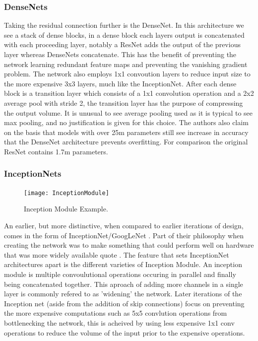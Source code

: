   \subsubsection{DenseNets}
    Taking the residual connection further is the DenseNet. In this architecture we see a stack of dense blocks, in a dense block each layers output is concatenated with each proceeding layer, notably a ResNet adds the output of the previous layer whereas DenseNets concatenate. This has the benefit of preventing the network learning redundant feature maps and preventing the vanishing gradient problem. The network also employs 1x1 convoution layers to reduce input size to the more expensive 3x3 layers, much like the InceptionNet. After each dense block is a transition layer which consists of a 1x1 convolution operation and a 2x2 average pool with stride 2, the transition layer has the purpose of compressing the output volume. It is unusual to see average pooling used as it is typical to see max pooling, and no justification is given for this choice. The authors also claim on the basis that models with over 25m parameters still see increase in accuracy that the DenseNet architecture prevents overfitting. For comparison the original ResNet contains 1.7m parameters.


  \subsubsection{InceptionNets}

    \begin{figure}
      \centering
      \texttt{[image: InceptionModule]}
      \caption{\label{fig:InceptionModule}Inception Module Example.}
    \end{figure}

    An earlier, but more distinctive, when compared to earlier iterations of design, comes in the form of InceptionNet/GoogLeNet \citep{Szegedy2015}. Part of their philosophy when creating the network was to make something that could perform well on hardware that was more widely available quote \citep{Szegedy2015}. The feature that sets InceptionNet architectures apart is the different varieties of Inception Module. An inception module is multiple convoulutional operations occuring in parallel and finally being concatenated together. This aproach of adding more channels in a single layer is commonly refered to as 'widening' the network. Later iterations of the Inception net (aside from the addition of skip connections) focus on preventing the more expensive computations such as 5x5 convlution operations from bottlenecking the network, this is acheived by using less expensive 1x1 conv operations to reduce the volume of the input prior to the expensive operations.
